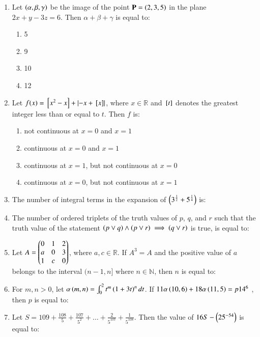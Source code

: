 \documentclass[journal]{IEEEtran}
\begin{document}
\begin{enumerate}
	\item 
	Let $\left(\alpha, \beta, \gamma\right)$ be the image of the point $\mathbf{P} = \left(2, 3, 5\right)$ in the plane $2x + y - 3z = 6$. Then $\alpha + \beta + \gamma$ is equal to:
		\begin{enumerate}
			\item 5
			\item 9
			\item 10
			\item 12
		\end{enumerate}

	\item
	Let $f(x) = {}\left[x^2 - x\right] + \left\vert-x + {}\left[x\right]\right\vert$, where $x \in \mathbb{R}$ and ${}\left[t\right]$ denotes the greatest integer less than or equal to $t$. Then $f$ is:
		\begin{enumerate}
			\item not continuous at $x = 0$ and $x = 1$
			\item continuous at $x = 0$ and $x = 1$
			\item continuous at $x = 1$, but not continuous at $x = 0$
			\item continuous at $x = 0$, but not continuous at $x = 1$
		\end{enumerate}

	\item 
	The number of integral terms in the expansion of $\left(3^{\frac{1}{2}} + 5^{\frac{1}{4}}\right)$ is:

	\item 
	The number of ordered triplets of the truth values of $p$, $q$, and $r$ such that the truth value of the statement $\left(p \lor q\right) \land \left(p \lor r\right) \implies \left(q \lor r\right)$ is true, is equal to:

	\item
	Let $A = \begin{pmatrix}0 & 1 & 2 \\ a & 0 & 3 \\ 1 & c & 0\end{pmatrix}$, where $a, c \in \mathbb{R}$. If $A^{3} = A$ and the positive value of $a$ belongs to the interval $(n-1,n]$ where $n \in \mathbb{N}$, then $n$ is equal to:

	\item 
	For $m, n > 0$, let $\alpha\left(m, n\right) = \int_{0}^{2} t^{m}\left(1+3t\right)^{n} dt$. If $11\alpha\left(10, 6\right) + 18\alpha\left(11, 5\right) = p 14^{6}$ , then $p$ is equal to:

	\item 
	Let $S = 109 + \frac{108}{5} + \frac{107}{5^2} + \dots + \frac{2}{5^{107}} + \frac{1}{5^{108}}$. Then the value of $16S - \left(25^{-54}\right)$ is equal to:


\end{enumerate}
\end{document}
